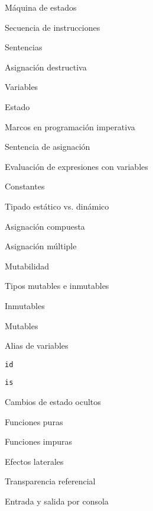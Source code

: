 \begin{longenum}
\begin{longenum}
\begin{longenum}
            \item Máquina de estados
            \item Secuencia de instrucciones
            \item Sentencias
        \end{longenum}
        \item Asignación destructiva
        \begin{longenum}
            \item Variables
            \item Estado
            \item Marcos en programación imperativa
            \item Sentencia de asignación
            \item Evaluación de expresiones con variables
            \item Constantes
            \item Tipado estático vs. dinámico
            \item Asignación compuesta
            \item Asignación múltiple
        \end{longenum}
        \item Mutabilidad
        \begin{longenum}
            \item Tipos mutables e inmutables
            \begin{longenum}
                \item Inmutables
                \item Mutables
            \end{longenum}
            \item Alias de variables
            \begin{longenum}
                \item \texttt{id}
                \item \texttt{is}
            \end{longenum}
        \end{longenum}
        \item Cambios de estado ocultos
        \begin{longenum}
            \item Funciones puras
            \item Funciones impuras
            \item Efectos laterales
            \item Transparencia referencial
            \item Entrada y salida por consola

\end{longenum}
\end{longenum}
\end{longenum}
